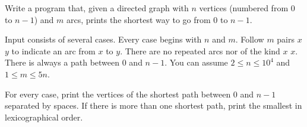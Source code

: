 

\Statement

Write a program that, given a directed graph
with $n$ vertices (numbered from 0 to $n-1$) and $m$ arcs,
prints the shortest way to go from 0 to $n-1$.


\Input

Input consists of several cases.
Every case begins with $n$ and $m$.
Follow $m$ pairs $x$ $y$ to indicate an arc from $x$ to $y$.
There are no repeated arcs nor of the kind $x$ $x$.
There is always a path between 0 and $n-1$.
You can assume $2 \le n \le 10^4$ and $1 \le m \le 5n$.


\Output

For every case, print the vertices of the shortest path between 0 and $n-1$
separated by spaces.
If there is more than one shortest path, print the smallest in lexicographical order.


\Sample

